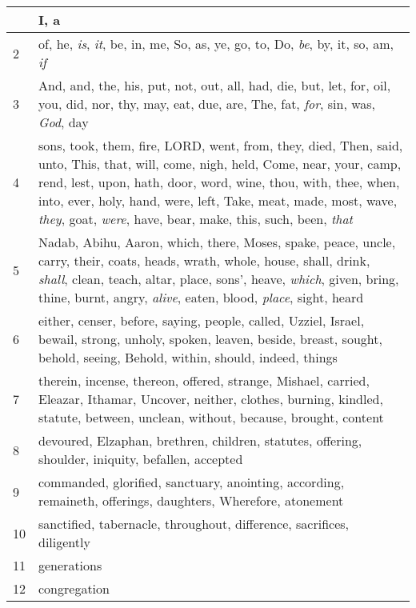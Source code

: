\begin{longtable}{l|p{3.75in}}
\hline \hline
\endlastfoot
1 & I, a \\ \hline
2 & of, he, \emph{is}, \emph{it}, be, in, me, So, as, ye, go, to, Do, \emph{be}, by, it, so, am, \emph{if} \\ \hline
3 & And, and, the, his, put, not, out, all, had, die, but, let, for, oil, you, did, nor, thy, may, eat, due, are, The, fat, \emph{for}, sin, was, \emph{God}, day \\ \hline
4 & sons, took, them, fire, LORD, went, from, they, died, Then, said, unto, This, that, will, come, nigh, held, Come, near, your, camp, rend, lest, upon, hath, door, word, wine, thou, with, thee, when, into, ever, holy, hand, were, left, Take, meat, made, most, wave, \emph{they}, goat, \emph{were}, have, bear, make, this, such, been, \emph{that} \\ \hline
5 & Nadab, Abihu, Aaron, which, there, Moses, spake, peace, uncle, carry, their, coats, heads, wrath, whole, house, shall, drink, \emph{shall}, clean, teach, altar, place, sons', heave, \emph{which}, given, bring, thine, burnt, angry, \emph{alive}, eaten, blood, \emph{place}, sight, heard \\ \hline
6 & either, censer, before, saying, people, called, Uzziel, Israel, bewail, strong, unholy, spoken, leaven, beside, breast, sought, behold, seeing, Behold, within, should, indeed, things \\ \hline
7 & therein, incense, thereon, offered, strange, Mishael, carried, Eleazar, Ithamar, Uncover, neither, clothes, burning, kindled, statute, between, unclean, without, because, brought, content \\ \hline
8 & devoured, Elzaphan, brethren, children, statutes, offering, shoulder, iniquity, befallen, accepted \\ \hline
9 & commanded, glorified, sanctuary, anointing, according, remaineth, offerings, daughters, Wherefore, atonement \\ \hline
10 & sanctified, tabernacle, throughout, difference, sacrifices, diligently \\ \hline
11 & generations \\ \hline
12 & congregation \\ \hline
\end{longtable}






 



